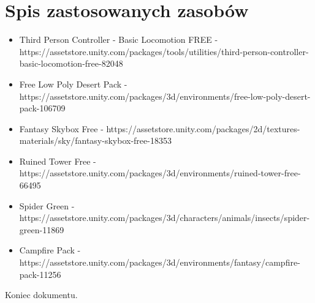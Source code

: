 \documentclass[10pt,a4paper]{article}
\begin{document}
\section{Spis zastosowanych zasobów}
\begin{itemize}
  \item Third Person Controller - Basic Locomotion FREE - https://assetstore.unity.com/packages/tools/utilities/third-person-controller-basic-locomotion-free-82048
  \item Free Low Poly Desert Pack - https://assetstore.unity.com/packages/3d/environments/free-low-poly-desert-pack-106709
  \item Fantasy Skybox Free - https://assetstore.unity.com/packages/2d/textures-materials/sky/fantasy-skybox-free-18353
  \item Ruined Tower Free - https://assetstore.unity.com/packages/3d/environments/ruined-tower-free-66495
  \item Spider Green - https://assetstore.unity.com/packages/3d/characters/animals/insects/spider-green-11869
  \item Campfire Pack - https://assetstore.unity.com/packages/3d/environments/fantasy/campfire-pack-11256
\end{itemize}

\noindent\makebox[\linewidth]{\rule{0.6\paperwidth}{0.4pt}}

\begin{center}
	Koniec dokumentu.
\end{center}
\end{document}
